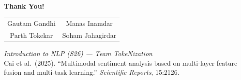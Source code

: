 \documentclass[aspectratio=169]{beamer}
\begin{document}
\begin{frame}[plain]
  \vfill
  \begin{center}
    {\Large\color{navyblue}\textbf{Thank You!}}

    \vspace{16pt}
    \begin{tabular}{cc}
      Gautam Gandhi & Manas Inamdar \\[4pt]
      Parth Tokekar & Soham Jahagirdar \\
    \end{tabular}

    \vspace{14pt}
    \textit{Introduction to NLP (S26) — Team TokeNization}\\[6pt]
    \footnotesize
    Cai et al.\ (2025). ``Multimodal sentiment analysis based on multi-layer
    feature fusion and multi-task learning.'' \textit{Scientific Reports}, 15:2126.
  \end{center}
  \vfill
\end{frame}
\end{document}
